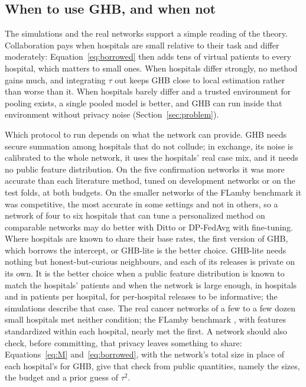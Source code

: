 \documentclass[acmsmall,screen,review]{acmart}
\theoremstyle{acmdefinition}
\begin{document}
\subsection{When to use GHB, and when not}\label{sec:when}

The simulations and the real networks support a simple reading of the theory. Collaboration pays when hospitals are small relative to their task and differ moderately: Equation~\eqref{eq:borrowed} then adds tens of virtual patients to every hospital, which matters to small ones. When hospitals differ strongly, no method gains much, and integrating $\tau$ out keeps GHB close to local estimation rather than worse than it. When hospitals barely differ and a trusted environment for pooling exists, a single pooled model is better, and GHB can run inside that environment without privacy noise (Section~\ref{sec:problem}).

Which protocol to run depends on what the network can provide. GHB needs secure summation among hospitals that do not collude; in exchange, its noise is calibrated to the whole network, it uses the hospitals' real case mix, and it needs no public feature distribution. On the five confirmation networks it was more accurate than each literature method, tuned on development networks or on the test folds, at both budgets. On the smaller networks of the FLamby benchmark \cite{ogierduterrail2022flamby} it was competitive, the most accurate in some settings and not in others, so a network of four to six hospitals that can tune a personalized method on comparable networks may do better with Ditto \cite{li2021ditto} or DP-FedAvg \cite{mcmahan2018learning} with fine-tuning. Where hospitals are known to share their base rates, the first version of GHB, which borrows the intercept, or GHB-lite is the better choice. GHB-lite needs nothing but honest-but-curious neighbours, and each of its releases is private on its own. It is the better choice when a public feature distribution is known to match the hospitals' patients and when the network is large enough, in hospitals and in patients per hospital, for per-hospital releases to be informative; the simulations describe that case. The real cancer networks of a few to a few dozen small hospitals met neither condition; the FLamby benchmark \cite{ogierduterrail2022flamby}, with features standardized within each hospital, nearly met the first. A network should also check, before committing, that privacy leaves something to share: Equations~\eqref{eq:M} and~\eqref{eq:borrowed}, with the network's total size in place of each hospital's for GHB, give that check from public quantities, namely the sizes, the budget and a prior guess of $\tau^2$.
\end{document}
